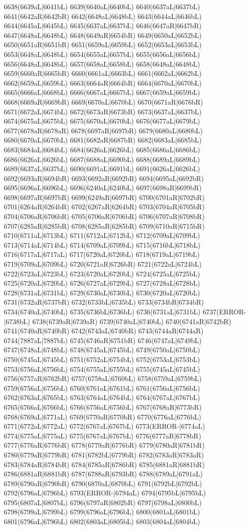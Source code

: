 6638(6639aL|6641bL) 6639(6640aL|6640bL) 6640(6637aL|6637bL) 6641(6642aR|6642bR) 6642(6648aL|6648bL) 6643(6644aL|6646bL) 6644(6645aL|6645bL) 6645(6637aL|6637bL) 6646(6647aR|6647bR) 6647(6648aL|6648bL) 6648(6649aR|6654bR) 6649(6650aL|6652bL) 6650(6651aR|6651bR) 6651(6659aL|6659bL) 6652(6653aL|6653bL) 6653(6648aL|6648bL) 6654(6655aL|6657bL) 6655(6656aL|6656bL) 6656(6648aL|6648bL) 6657(6658aL|6658bL) 6658(6648aL|6648bL) 6659(6660aR|6665bR) 6660(6661aL|6663bL) 6661(6662aL|6662bL) 6662(6659aL|6659bL) 6663(6664aR|6664bR) 6664(6670aL|6670bL) 6665(6666aL|6668bL) 6666(6667aL|6667bL) 6667(6659aL|6659bL) 6668(6669aR|6669bR) 6669(6670aL|6670bL) 6670(6671aR|6676bR) 6671(6672aL|6674bL) 6672(6673aR|6673bR) 6673(6637aL|6637bL) 6674(6675aL|6675bL) 6675(6670aL|6670bL) 6676(6677aL|6679bL) 6677(6678aR|6678aR) 6678(6697aR|6697bR) 6679(6680aL|6680bL) 6680(6670aL|6670bL) 6681(6682aR|6687bR) 6682(6683aL|6685bL) 6683(6684aL|6684bL) 6684(6626aL|6626bL) 6685(6686aL|6686bL) 6686(6626aL|6626bL) 6687(6688aL|6690bL) 6688(6689aL|6689bL) 6689(6637aL|6637bL) 6690(6691aL|6691bL) 6691(6626aL|6626bL) 6692(6693aR|6694bR) 6693(6692aR|6692bR) 6694(6695aL|6692bR) 6695(6696aL|6696bL) 6696(6240aL|6240bL) 6697(6698aR|6699bR) 6698(6697aR|6697bR) 6699(6249aR|6697bR) 6700(6701aR|6702bR) 6701(6264aR|6264bR) 6702(6267aR|6264bR) 6703(6704aR|6705bR) 6704(6706aR|6706bR) 6705(6706aR|6706bR) 6706(6707aR|6708bR) 6707(6285aR|6285bR) 6708(6285aR|6285bR) 6709(6710aR|6715bR) 6710(6711aL|6713bL) 6711(6712aL|6712bL) 6712(6709aL|6709bL) 6713(6714aL|6714bL) 6714(6709aL|6709bL) 6715(6716bL|6718bL) 6716(6717aL|6717aL) 6717(6720aL|6720bL) 6718(6719aL|6719bL) 6719(6709aL|6709bL) 6720(6721aR|6726bR) 6721(6722aL|6724bL) 6722(6723aL|6723bL) 6723(6720aL|6720bL) 6724(6725aL|6725bL) 6725(6720aL|6720bL) 6726(6727aL|6729bL) 6727(6728aL|6728bL) 6728(6731aL|6731bL) 6729(6730aL|6730bL) 6730(6720aL|6720bL) 6731(6732aR|6737bR) 6732(6733bL|6735bL) 6733(6734bR|6734bR) 6734(6740aL|6740bL) 6735(6736bL|6736bL) 6736(6731aL|6731bL) 6737(ERROR-|6738bL) 6738(6739aR|6739aR) 6739(6740aL|6740bL) 6740(6741aR|6742bR) 6741(6740aR|6740bR) 6742(6743aL|6740bR) 6743(6744aR|6744aR) 6744(7887aL|7887bL) 6745(6746aR|6751bR) 6746(6747aL|6749bL) 6747(6748aL|6748bL) 6748(6745aL|6745bL) 6749(6750aL|6750bL) 6750(6745aL|6745bL) 6751(6752aL|6754bL) 6752(6753aL|6753bL) 6753(6756aL|6756bL) 6754(6755aL|6755bL) 6755(6745aL|6745bL) 6756(6757aR|6762bR) 6757(6758aL|6760bL) 6758(6759aL|6759bL) 6759(6756aL|6756bL) 6760(6761aL|6761bL) 6761(6756aL|6756bL) 6762(6763aL|6765bL) 6763(6764aL|6764bL) 6764(6767aL|6767bL) 6765(6766aL|6766bL) 6766(6756aL|6756bL) 6767(6768aR|6773bR) 6768(6769aL|6771aL) 6769(6770aR|6770bR) 6770(6776aL|6776bL) 6771(6772aL|6772aL) 6772(6767aL|6767bL) 6773(ERROR-|6774aL) 6774(6775aL|6775aL) 6775(6767aL|6767bL) 6776(6777aR|6778bR) 6777(6776aR|6776bR) 6778(6779aR|6776bR) 6779(6780aR|6781bR) 6780(6779aR|6779bR) 6781(6782bL|6779bR) 6782(6783aR|6783aR) 6783(6784aR|6784bR) 6784(6785aR|6786bR) 6785(6881aR|6881bR) 6786(6881aR|6881bR) 6787(6788aR|6793bR) 6788(6789aL|6791aL) 6789(6790aR|6790bR) 6790(6870aL|6870bL) 6791(6792bL|6792bL) 6792(6796aL|6796bL) 6793(ERROR-|6794aL) 6794(6795bL|6795bL) 6795(6807aL|6807bL) 6796(6797aR|6802bR) 6797(6798aL|6800bL) 6798(6799aL|6799bL) 6799(6796aL|6796bL) 6800(6801aL|6801bL) 6801(6796aL|6796bL) 6802(6803aL|6805bL) 6803(6804aL|6804bL) 